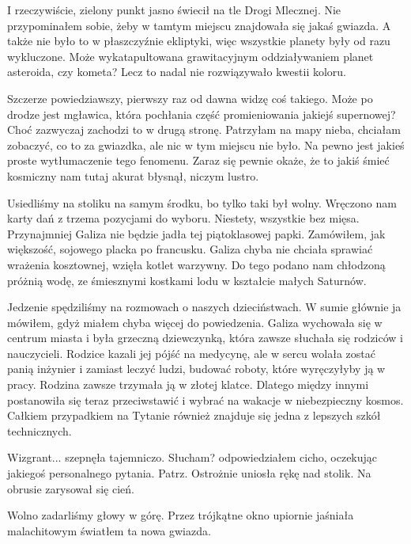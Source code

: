I rzeczywiście, zielony punkt jasno świecił na tle Drogi Mlecznej.
Nie przypominałem sobie, żeby w tamtym miejscu znajdowała się jakaś gwiazda.
A także nie było to w płaszczyźnie ekliptyki, więc wszystkie planety były od razu wykluczone.
Może wykatapultowana grawitacyjnym oddziaływaniem planet asteroida, czy kometa?
Lecz to nadal nie rozwiązywało kwestii koloru.

\begin{dialogue}
	\ds{} Szczerze powiedziawszy, pierwszy raz od dawna widzę coś takiego. Może po drodze jest mgławica, która pochłania część promieniowania jakiejś supernowej? 
		Choć zazwyczaj zachodzi to w drugą stronę.
	\ds{} Patrzyłam na mapy nieba, chciałam zobaczyć, co to za gwiazdka, ale nic w tym miejscu nie było.
	\ds{} Na pewno jest jakieś proste wytłumaczenie tego fenomenu. Zaraz się pewnie okaże, że to jakiś śmieć kosmiczny nam tutaj akurat błysnął, niczym lustro.
\end{dialogue}

Usiedliśmy na stoliku na samym środku, bo tylko taki był wolny.
Wręczono nam karty dań z trzema pozycjami do wyboru. Niestety, wszystkie bez mięsa. Przynajmniej Galiza nie będzie jadła tej piątoklasowej papki.
Zamówiłem, jak większość, sojowego placka po francusku.
Galiza chyba nie chciała sprawiać wrażenia kosztownej, wzięła kotlet warzywny.
Do tego podano nam chłodzoną próżnią wodę, ze śmiesznymi kostkami lodu w kształcie małych Saturnów.

Jedzenie spędziliśmy na rozmowach o naszych dzieciństwach.
W sumie głównie ja mówiłem, gdyż miałem chyba więcej do powiedzenia.
Galiza wychowała się w centrum miasta i była grzeczną dziewczynką, która zawsze słuchała się rodziców i nauczycieli.
Rodzice kazali jej pójść na medycynę, ale w sercu wolała zostać panią inżynier i zamiast leczyć ludzi, budować roboty, które wyręczyłyby ją w pracy.
Rodzina zawsze trzymała ją w złotej klatce.
Dlatego między innymi postanowiła się teraz przeciwstawić i wybrać na wakacje w niebezpieczny kosmos.
Całkiem przypadkiem na Tytanie również znajduje się jedna z lepszych szkół technicznych.

\begin{dialogue}
	\ds{} Wizgrant... \dm{} szepnęła tajemniczo.
	\ds{} Słucham? \dm{} odpowiedziałem cicho, oczekując jakiegoś personalnego pytania.
	\ds{} Patrz. \dm{} Ostrożnie uniosła rękę nad stolik. Na obrusie zarysował się cień.
\end{dialogue}

Wolno zadarliśmy głowy w górę. Przez trójkątne okno upiornie jaśniała malachitowym światłem ta nowa gwiazda.

